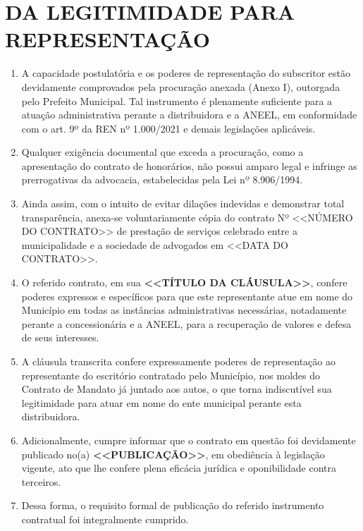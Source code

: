 \section{DA LEGITIMIDADE PARA REPRESENTAÇÃO}

\begin{enumerate}[resume]
\item A capacidade postulatória e os poderes de representação do subscritor estão devidamente comprovados pela procuração anexada (Anexo I), outorgada pelo Prefeito Municipal. Tal instrumento é plenamente suficiente para a atuação administrativa perante a distribuidora e a ANEEL, em conformidade com o art. 9º da REN nº 1.000/2021 e demais legislações aplicáveis.
\item Qualquer exigência documental que exceda a procuração, como a apresentação do contrato de honorários, não possui amparo legal e infringe as prerrogativas da advocacia, estabelecidas pela Lei nº 8.906/1994.
\item Ainda assim, com o intuito de evitar dilações indevidas e demonstrar total transparência, anexa-se voluntariamente cópia do contrato Nº <<NÚMERO DO CONTRATO>> de prestação de serviços celebrado entre a municipalidade e a sociedade de advogados em <<DATA DO CONTRATO>>.
\item O referido contrato, em sua \textbf{<<TÍTULO DA CLÁUSULA>>}, confere poderes expressos e específicos para que este representante atue em nome do Município em todas as instâncias administrativas necessárias, notadamente perante a concessionária e a ANEEL, para a recuperação de valores e defesa de seus interesses.
\item A cláusula transcrita confere expressamente poderes de representação ao representante do escritório contratado pelo Município, nos moldes do Contrato de Mandato já juntado aos autos, o que torna indiscutível sua legitimidade para atuar em nome do ente municipal perante esta distribuidora.
\item Adicionalmente, cumpre informar que o contrato em questão foi devidamente publicado no(a) \textbf{<<PUBLICAÇÃO>>}, em obediência à legislação vigente, ato que lhe confere plena eficácia jurídica e oponibilidade contra terceiros.
\item Dessa forma, o requisito formal de publicação do referido instrumento contratual foi integralmente cumprido. 
\end{enumerate}

